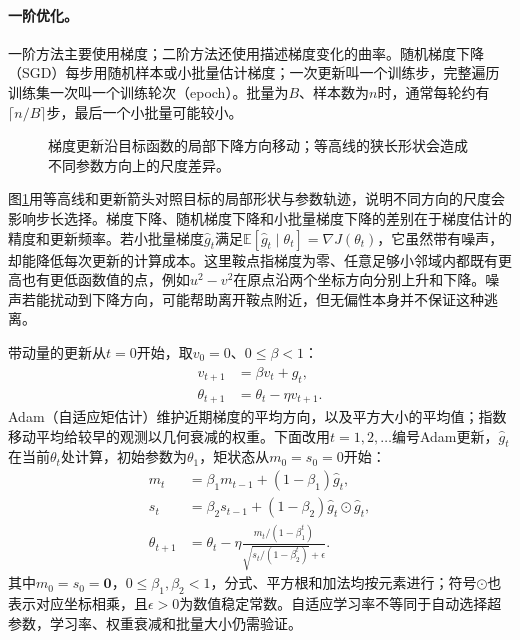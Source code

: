 \paragraph{一阶优化。}
一阶方法主要使用梯度；二阶方法还使用描述梯度变化的曲率。随机梯度下降（SGD）每步用随机样本或小批量估计梯度；一次更新叫一个训练步，完整遍历训练集一次叫一个训练轮次（epoch）。批量为$B$、样本数为$n$时，通常每轮约有$\lceil n/B\rceil$步，最后一个小批量可能较小。
\begin{figure}[htbp]
\centering
{}
\caption{梯度更新沿目标函数的局部下降方向移动；等高线的狭长形状会造成不同参数方向上的尺度差异。}
\label{fig:optimization-descent-path}
\end{figure}
图\ref{fig:optimization-descent-path}用等高线和更新箭头对照目标的局部形状与参数轨迹，说明不同方向的尺度会影响步长选择。梯度下降、随机梯度下降和小批量梯度下降的差别在于梯度估计的精度和更新频率。若小批量梯度$\hat g_t$满足$\mathbb{E}[\hat g_t\mid\theta_t]=\nabla J(\theta_t)$，它虽然带有噪声，却能降低每次更新的计算成本。这里鞍点指梯度为零、任意足够小邻域内都既有更高也有更低函数值的点，例如$u^2-v^2$在原点沿两个坐标方向分别上升和下降。噪声若能扰动到下降方向，可能帮助离开鞍点附近，但无偏性本身并不保证这种逃离。

带动量的更新从$t=0$开始，取$v_0=0$、$0\leq\beta<1$：
\begin{align}
 v_{t+1}&=\beta v_t+\hat g_t,\\
 \theta_{t+1}&=\theta_t-\eta v_{t+1}.
\end{align}
Adam（自适应矩估计）维护近期梯度的平均方向，以及平方大小的平均值；指数移动平均给较早的观测以几何衰减的权重。下面改用$t=1,2,\ldots$编号Adam更新，$\hat g_t$在当前$\theta_t$处计算，初始参数为$\theta_1$，矩状态从$m_0=s_0=0$开始：
\begin{align}
 m_t&=\beta_1m_{t-1}+(1-\beta_1)\hat g_t,\\
 s_t&=\beta_2s_{t-1}+(1-\beta_2)\hat g_t\odot\hat g_t,\\
 \theta_{t+1}&=\theta_t-\eta\frac{m_t/(1-\beta_1^t)}{\sqrt{s_t/(1-\beta_2^t)}+\epsilon}.
\end{align}
其中$m_0=s_0=\mathbf0$，$0\leq\beta_1,\beta_2<1$，分式、平方根和加法均按元素进行；符号$\odot$也表示对应坐标相乘，且$\epsilon>0$为数值稳定常数。自适应学习率不等同于自动选择超参数，学习率、权重衰减和批量大小仍需验证。

